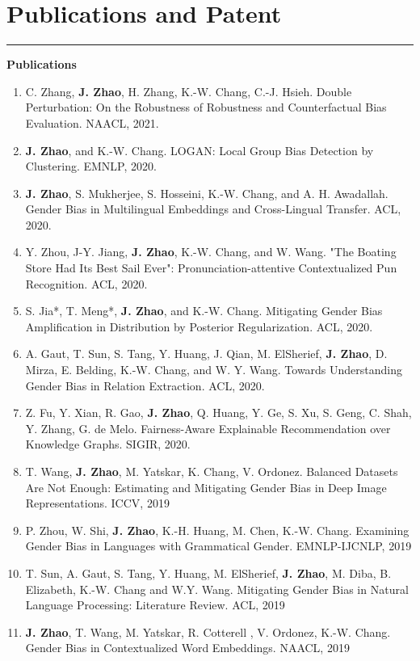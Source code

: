 \documentclass[11pt, a4paper]{article}
\newcommand{\hr}{\hrule\vspace{0.5em}}
\begin{document}
\section*{Publications and Patent}
\hr
\hspace{0.32in}\textbf{Publications}
\begin{enumerate}
	\item C. Zhang, \textbf{J. Zhao}, H. Zhang, K.-W. Chang, C.-J. Hsieh. Double Perturbation: On the Robustness of Robustness and Counterfactual Bias Evaluation. NAACL, 2021.
	\item \textbf{J. Zhao}, and K.-W. Chang. LOGAN: Local Group Bias Detection by Clustering. EMNLP, 2020. 
	\item \textbf{J. Zhao}, S. Mukherjee, S. Hosseini, K.-W. Chang, and A. H. Awadallah. Gender Bias in Multilingual Embeddings and Cross-Lingual Transfer. ACL, 2020.
	\item Y. Zhou, J-Y. Jiang, \textbf{J. Zhao}, K.-W. Chang, and W. Wang. "The Boating Store Had Its Best Sail Ever": Pronunciation-attentive Contextualized Pun Recognition. ACL, 2020.
	\item S. Jia*, T. Meng*, \textbf{J. Zhao}, and K.-W. Chang. Mitigating Gender Bias Amplification in Distribution by Posterior Regularization.  ACL, 2020.
	\item A. Gaut, T. Sun, S. Tang, Y. Huang, J. Qian, M. ElSherief, \textbf{J. Zhao}, D. Mirza, E. Belding, K.-W. Chang, and W. Y. Wang. Towards Understanding Gender Bias in Relation Extraction.  ACL, 2020.
	\item Z. Fu, Y. Xian, R. Gao, \textbf{J. Zhao}, Q. Huang, Y. Ge, S. Xu, S. Geng, C. Shah, Y. Zhang, G. de Melo. Fairness-Aware Explainable Recommendation over Knowledge Graphs.   SIGIR,  2020.
	\item T. Wang, \textbf{J. Zhao},  M. Yatskar, K. Chang, V. Ordonez. Balanced Datasets Are Not Enough: Estimating and Mitigating Gender Bias in Deep Image Representations. ICCV, 2019
	\item P. Zhou, W. Shi, \textbf{J. Zhao}, K.-H. Huang, M. Chen, K.-W. Chang. Examining Gender Bias in Languages with Grammatical Gender. EMNLP-IJCNLP, 2019
	\item T. Sun, A. Gaut, S. Tang, Y. Huang, M. ElSherief, \textbf{J. Zhao}, M. Diba, B. Elizabeth, K.-W. Chang and W.Y. Wang. Mitigating Gender Bias in Natural Language Processing: Literature Review.  ACL, 2019
	\item \textbf{J. Zhao}, T. Wang, M. Yatskar, R. Cotterell , V. Ordonez, K.-W. Chang. Gender Bias in Contextualized Word Embeddings.  NAACL, 2019

\end{enumerate}
\end{document}
